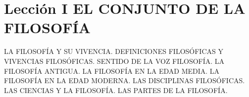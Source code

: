 \documentclass[10pt,letterpaper]{book}
\author{Manuel Garc\'{i}a Morente}
\begin{document}
\chapter*{Lecci\'{o}n I EL CONJUNTO DE LA FILOSOF\'{I}A}
LA FILOSOFÍA Y SU VIVENCIA. DEFINICIONES FILOSÓFICAS Y VIVENCIAS FILOSÓFICAS. SENTIDO DE LA VOZ FILOSOFÍA. LA FILOSOFÍA ANTIGUA. LA FILOSOFÍA EN LA EDAD ME­DIA. LA FILOSOFÍA EN LA EDAD MODERNA. LAS DISCIPLI­NAS FILOSÓFICAS. LAS CIENCIAS Y LA FILOSOFÍA. LAS PAR­TES DE LA FILOSOFÍA.
\end{document}
